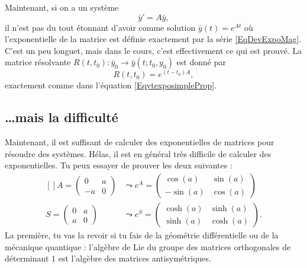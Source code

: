 Maintenant, si on a un système
\begin{equation}
	\bar y'=A\bar y,
\end{equation}
il n'est pas du tout étonnant d'avoir comme solution $\bar y(t)= e^{At}$ où l'exponentielle de la matrice est définie exactement par la série \eqref{EqDevExpoMag}. C'est un peu longuet, mais dans le cours, c'est effectivement ce qui est prouvé. La matrice résolvante $R(t,t_0)\colon \bar y_0\to \bar y(t;t_0,y_0)$ est donné par
\begin{equation}
	R(t,t_0)= e^{(t-t_0)A},
\end{equation}
exactement comme dans l'équation \eqref{EqytexposimpleProp}.

					\subsection{\ldots mais la difficulté}

Maintenant, il est suffisant de calculer des exponentielles de matrices pour résoudre des systèmes. Hélas, il est en général très difficile de calculer des exponentielles. Tu peux essayer de prouver les deux suivantes :
\begin{equation}
	\begin{aligned}[]
		A=\begin{pmatrix}
	0	&	a	\\ 
	-a	&	0	
\end{pmatrix}	&\leadsto  e^{A}=\begin{pmatrix}
	\cos(a)	&	\sin(a)	\\ 
	-\sin(a)	&	\cos(a)	
\end{pmatrix}\\
		S=\begin{pmatrix}
	0	&	a	\\ 
	a	&	0	
\end{pmatrix}	&\leadsto  e^{S}=\begin{pmatrix}
	\cosh(a)	&	\sinh(a)	\\ 
	\sinh(a)	&	\cosh(a)	
\end{pmatrix}.
	\end{aligned}
\end{equation}
La première, tu vas la revoir si tu fais de la géométrie différentielle ou de la mécanique quantique : l'algèbre de Lie du groupe des matrices orthogonales de déterminant $1$ est l'algèbre des matrices antisymétriques.

